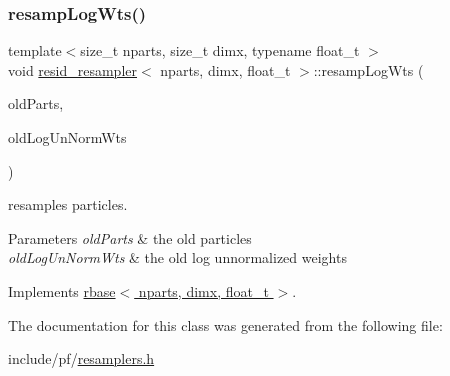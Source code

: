 \subsubsection{\texorpdfstring{resamp\+Log\+Wts()}{resampLogWts()}}
{\footnotesize\ttfamily template$<$size\+\_\+t nparts, size\+\_\+t dimx, typename float\+\_\+t $>$ \\
void \hyperlink{classresid__resampler}{resid\+\_\+resampler}$<$ nparts, dimx, float\+\_\+t $>$\+::resamp\+Log\+Wts (\begin{DoxyParamCaption}\item[{\hyperlink{classrbase_aa12fc826befa6ba0647b5f59ebc396ee}{array\+Vec} \&}]{old\+Parts,  }\item[{\hyperlink{classrbase_a6f76bef853e508cb5b6f546d231b06f5}{array\+Float} \&}]{old\+Log\+Un\+Norm\+Wts }\end{DoxyParamCaption})\hspace{0.3cm}{\ttfamily [virtual]}}



resamples particles. 


\begin{DoxyParams}{Parameters}
{\em old\+Parts} & the old particles \\
\hline
{\em old\+Log\+Un\+Norm\+Wts} & the old log unnormalized weights \\
\hline
\end{DoxyParams}


Implements \hyperlink{classrbase_aff0f6f88fd4656e67f5ebc870f10dd44}{rbase$<$ nparts, dimx, float\+\_\+t $>$}.



The documentation for this class was generated from the following file\+:\begin{DoxyCompactItemize}
\item 
include/pf/\hyperlink{resamplers_8h}{resamplers.\+h}\end{DoxyCompactItemize}
